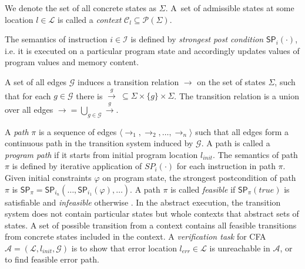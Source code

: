\noindent
We denote the set of all concrete states as $\Sigma$.  A~set of admissible
states at some location $l \in \mathcal{L}$ is called a \emph{context}
$\mathcal{C}_l \subseteq \mathcal{P}(\Sigma)$.

The semantics of instruction $i \in \mathcal{I}$ is defined by \emph{strongest
post condition} $\textsf{SP}_{i}(\cdot)$, i.e. it is executed on a particular program
state and accordingly updates values of program values and memory content.

A set of all edges $\mathcal{G}$ induces a transition relation $\rightarrow$ on
the set of states $\Sigma$, such that for each $g \in \mathcal{G}$ there is
$\xrightarrow{g} \: \subseteq \Sigma \times \{g\} \times \Sigma$. The
transition relation is a union over all edges $\rightarrow = \bigcup_{g
\in\mathcal{G}} \xrightarrow{g}$.

A \emph{path} $\pi$ is a sequence of edges $\langle
\rightarrow_1, \rightarrow_2, \dots, \rightarrow_n \rangle$ such that all edges
form a continuous path in the transition system induced by $\mathcal{G}$.  A path
is called a \emph{program path} if it starts from initial program location
$l_{\textit{init}}$. The semantics of path $\pi$ is defined by iterative
application of $SP_{i}( \cdot )$ for each instruction in path $\pi$. Given
initial constraints $\varphi$ on program state, the strongest postcondition of
path $\pi$ is $\textsf{SP}_{\pi} =
\textsf{SP}_{i_n}(\dots,\textsf{SP}_{i_1}(\varphi),\dots)$. A path $\pi$ is
called \emph{feasible} if $\textsf{SP}_{\pi}(\textit{true})$ is satisfiable and
\emph{infeasible} otherwise \cite{Beyer2018b}.  In the abstract execution, the
transition system does not contain particular states but whole contexts that
abstract sets of states. A set of possible transition from a context contains
all feasible transitions from concrete states included in the context.
A \emph{verification task} for  CFA $\mathcal{A} = (\mathcal{L},
l_{\textit{init}}, \mathcal{G})$ is to show that error location
$l_{\textit{err}} \in \mathcal{L}$ is unreachable in $\mathcal{A}$, or to find
feasible error path.

